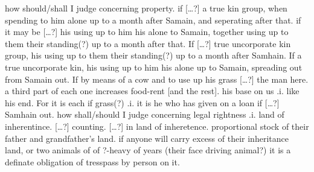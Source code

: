 \documentclass[11pt]{article}
\begin{document}
\begin{pages}
\begin{Rightside}
    \beginnumbering\pstart
    how should/shall I judge concerning property. if [\ldots?] a true kin group, when spending to him alone up to a month after Samain, and seperating after that. if it may be [\ldots?] his using up to him his alone to Samain, together using up to them their standing(?) up to a month after that.  If [\ldots?] true uncorporate kin group, his using up to them their standing(?) up to a month after Samhain.  If a true uncorporate kin, his using up to him his alone up to Samain, spreading out from Samain out.  If by means of a cow and to use up his grass [\ldots?] the man here.  a third part of each one increases food-rent [and the rest].\hspace{2mm} his base on us .i. like his end. For it is each if grass(?) .i. it is he who has given on a loan if [\ldots?] Samhain out.  how shall/should I judge concerning legal rightness .i. land of inherentince.  [\ldots?] counting.  [\ldots?] in land of inheretence.  proportional stock of their father and grandfather's land. if anyone will carry excess of their inheritance land, or two animals of of ?-heavy of years (their face driving animal?) it is a definate obligation of tresspass by person on it. 
    \pend
    \endnumbering
  \end{Rightside}

  \Pages
\end{pages}
\end{document}
